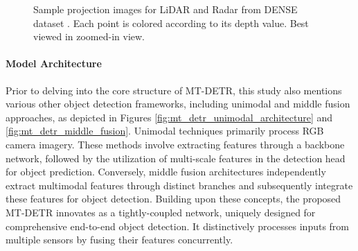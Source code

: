 \documentclass[report.tex]{subfiles}
\begin{document}
\begin{figure}[ht]
        \caption{Sample projection images for LiDAR and Radar from DENSE dataset \cite{bijelic2020seeing}. Each point is colored according to its depth value. Best viewed in zoomed-in view.}
        \label{fig:mt_detr_projection_image}
    \end{figure}

    \paragraph*{Model Architecture}



    Prior to delving into the core structure of MT-DETR, this study also mentions various other object detection frameworks, including unimodal and middle fusion approaches, as depicted in Figures \ref{fig:mt_detr_unimodal_architecture} and \ref{fig:mt_detr_middle_fusion}. Unimodal techniques primarily process RGB camera imagery. These methods involve extracting features through a backbone network, followed by the utilization of multi-scale features in the detection head for object prediction. Conversely, middle fusion architectures independently extract multimodal features through distinct branches and subsequently integrate these features for object detection. Building upon these concepts, the proposed MT-DETR innovates as a tightly-coupled network, uniquely designed for comprehensive end-to-end object detection. It distinctively processes inputs from multiple sensors by fusing their features concurrently.
\end{document}

